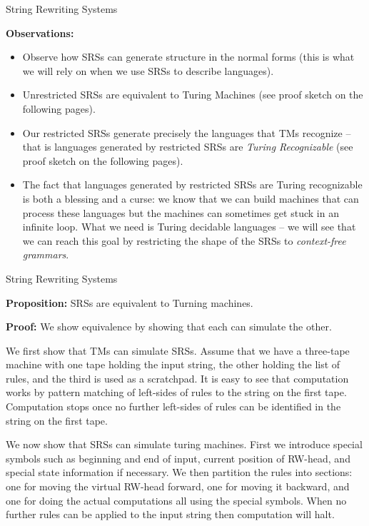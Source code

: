 \documentclass{beamer}
\begin{document}
\begin{frame}[fragile]{String Rewriting Systems}

{\bf Observations:}
\begin{itemize}
\item Observe how SRSs can generate structure in the normal forms (this is what we will rely on when
we use SRSs to describe languages).
\item Unrestricted SRSs are equivalent to Turing Machines (see proof sketch on the following pages).
\item Our restricted SRSs generate precisely
the languages that TMs recognize -- that is languages generated by restricted SRSs are {\em Turing Recognizable} (see proof sketch on the following pages).
\item The fact that languages generated by restricted SRSs are Turing recognizable is both a blessing and a curse: we know 
that we can build machines that can process these languages but the machines can sometimes get stuck in
an infinite loop.  What we need is Turing decidable languages -- we will see that we can reach this goal by restricting
the shape of the SRSs to {\em context-free grammars}.
\end{itemize}
\end{frame}

\begin{frame}[fragile]{String Rewriting Systems}

\scriptsize
{\bf Proposition:} SRSs are equivalent to Turning machines.

\vspace{.1in}

{\bf Proof:} We show equivalence by showing that each can simulate the other. 

\vspace{.1in}
We first show that TMs can simulate SRSs.  Assume that we have a 
three-tape machine with one tape holding the input string, the other holding the list of rules, and the third is used as a scratchpad.  It is easy to see that computation works by pattern matching of left-sides of rules to the string on the first tape.  Computation stops once no further left-sides of rules
can be identified in the string on the first tape.

\vspace{.1in}
We now show that SRSs can simulate turing machines.  First we introduce special symbols such as beginning and end of input, 
current position of RW-head, and special state information if necessary.  We then partition the rules into sections: one for moving the virtual RW-head forward, one for moving it backward,
and one for doing the actual computations all using the special symbols.  When no further rules can be applied to the input string then computation will halt.
\end{frame}
\end{document}
